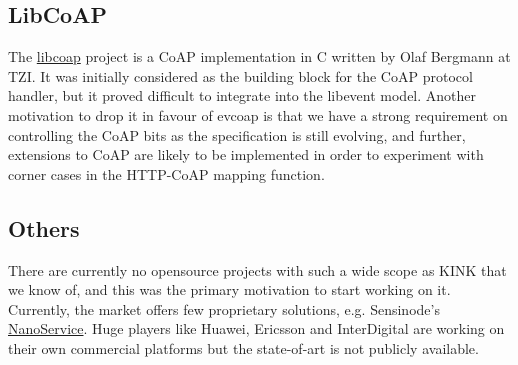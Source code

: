 \subsection{LibCoAP}
The \href{http://sourceforge.net/projects/libcoap}{libcoap} project is a CoAP implementation in C written by Olaf Bergmann at TZI.
It was initially considered as the building block for the CoAP protocol handler, but it proved difficult to integrate into the libevent model.  Another motivation to drop it in favour of evcoap is that we have a strong requirement on controlling the CoAP bits as the specification is still evolving, and further, extensions to CoAP are likely to be implemented in order to experiment with corner cases in the HTTP-CoAP mapping function.

\subsection{Others}
\label{sec:related-others}
There are currently no opensource projects with such a wide scope as KINK that we know of, and this was the primary motivation to start working on it.
Currently, the market offers few proprietary solutions, e.g. Sensinode's \href{http://www.sensinode.com/EN/products/nanoservice.html}{NanoService}.  Huge players like Huawei, Ericsson and InterDigital are working on their own commercial platforms but the state-of-art is not publicly available.
